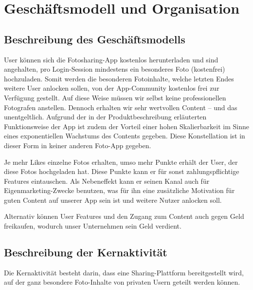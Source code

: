 \chapter{Geschäftsmodell und Organisation}


\section{Beschreibung des Geschäftsmodells}

User können sich die Fotosharing-App kostenlos herunterladen und sind angehalten, pro Login-Session mindestens ein besonderes Foto (kostenfrei) hochzuladen. Somit werden die besonderen Fotoinhalte, welche letzten Endes weitere User anlocken sollen, von der App-Community kostenlos frei zur Verfügung gestellt. Auf diese Weise müssen wir selbst keine professionellen Fotografen anstellen. Dennoch erhalten wir sehr wertvollen Content – und das unentgeltlich. Aufgrund der in der Produktbeschreibung erläuterten Funktionsweise der App ist zudem der Vorteil einer hohen Skalierbarkeit im Sinne eines exponentiellen Wachstums des Contents gegeben. Diese Konstellation ist in dieser Form in keiner anderen Foto-App gegeben.

Je mehr Likes einzelne Fotos erhalten, umso mehr Punkte erhält der User, der diese Fotos hochgeladen hat. Diese Punkte kann er für sonst zahlungspflichtige Features eintauschen. Als Nebeneffekt kann er seinen Kanal auch für Eigenmarketing-Zwecke benutzen, was für ihn eine zusätzliche Motivation für guten Content auf unserer App sein ist und weitere Nutzer anlocken soll.

Alternativ können User Features und den Zugang zum Content auch gegen Geld freikaufen, wodurch unser Unternehmen sein Geld verdient.


\section{Beschreibung der Kernaktivität}
Die Kernaktivität besteht darin, dass eine Sharing-Plattform bereitgestellt wird, auf der ganz besondere Foto-Inhalte von privaten Usern geteilt werden können.



